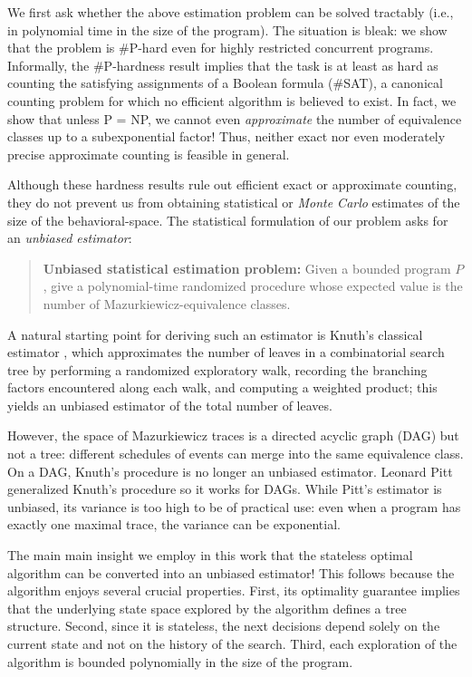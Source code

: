 We first ask whether the above estimation problem can be solved
tractably (i.e., in polynomial time in the size of the program).
The situation is bleak:
we show that the problem is \#P-hard even for highly restricted concurrent programs.
Informally, the \#P-hardness result implies that the task is at least as hard as
counting the satisfying assignments of a Boolean formula (\#SAT), a canonical
counting problem for which no efficient algorithm is believed to exist.
In fact, we show that unless \textsf{P} = \textsf{NP}, we cannot even \emph{approximate} the number of equivalence classes
up to a subexponential factor!
Thus, neither exact nor even moderately precise approximate
counting is feasible in general.

Although these hardness results rule out efficient exact or approximate
counting, they do not prevent us from obtaining statistical or \emph{Monte Carlo}
estimates of the size of the behavioral-space.
The statistical formulation of our problem asks for an \emph{unbiased estimator}:
\begin{quote}
{\bf Unbiased statistical estimation problem:} Given a bounded program \(P\), give a polynomial-time randomized procedure whose expected value is the number of Mazurkiewicz-equivalence classes.
\end{quote}
%

A natural starting point for deriving such an estimator is Knuth's classical
estimator \cite{knuth75}, which approximates the number of leaves in a
combinatorial search tree by performing a randomized exploratory
walk, recording the branching factors encountered along each walk, and
computing a weighted product; this yields an unbiased estimator of the total
number of leaves.


However, the space of Mazurkiewicz traces is a directed acyclic graph (DAG) but not a tree:
different schedules of events can merge into the same equivalence class.
On a DAG, Knuth's procedure is no longer an unbiased estimator.
Leonard Pitt generalized Knuth's procedure so it works for DAGs\cite{pitt}.
While Pitt's estimator is unbiased, its variance is too high to be of practical use: 
even when a program has exactly one maximal trace, the variance can be exponential.

The main main insight we employ in this work that the \trust stateless optimal \dpor algorithm \cite{trust}
can be converted into an unbiased estimator!
This follows because the \trust algorithm enjoys several crucial properties.
First, its optimality guarantee implies that the underlying state space explored by the algorithm defines a tree structure.
Second, since it is stateless, the next decisions depend solely on the current state and not on the history of the search.
Third, each exploration of the algorithm is bounded polynomially in the size of the program.

